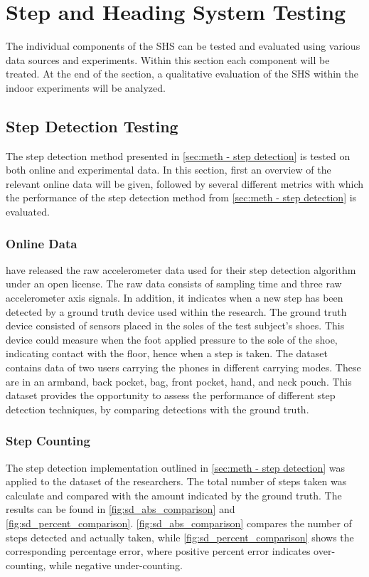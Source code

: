 \section[SHS Testing]{Step and Heading System Testing}
\label{sec:results-SHS}
The individual components of the \acl{SHS} can be tested and evaluated using various data sources and experiments. Within this section each component will be treated. At the end of the section, a qualitative evaluation of the \ac{SHS} within the indoor experiments will be analyzed. 

\subsection{Step Detection Testing}
\label{sec:results-step_detection}
The step detection method presented in \cref{sec:meth - step detection} is tested on both online and experimental data. In this section, first an overview of the relevant online data will be given, followed by several different metrics with which the performance of the step detection method from \cref{sec:meth - step detection} is evaluated. 


\subsubsection{Online Data}
\citet{Salvi2018} have released the raw accelerometer data used for their step detection algorithm under an open license. The raw data consists of sampling time and three raw accelerometer axis signals. In addition, it indicates when a new step has been detected by a ground truth device used within the research. The ground truth device consisted of sensors placed in the soles of the test subject's shoes. This device could measure when the foot applied pressure to the sole of the shoe, indicating contact with the floor, hence when a step is taken. The dataset contains data of two users carrying the phones in different carrying modes. These are in an armband, back pocket, bag, front pocket, hand, and neck pouch. This dataset provides the opportunity to assess the performance of different step detection techniques, by comparing detections with the ground truth.\par

\subsubsection{Step Counting}

The step detection implementation outlined in \cref{sec:meth - step detection} was applied to the dataset of the researchers. The total number of steps taken was calculate and compared with the amount indicated by the ground truth. The results can be found in  \cref{fig:sd_abs_comparison} and \cref{fig:sd_percent_comparison}. \cref{fig:sd_abs_comparison} compares the number of steps detected and actually taken, while \cref{fig:sd_percent_comparison}  shows the corresponding percentage error, where positive percent error indicates over-counting, while negative under-counting. \par 

